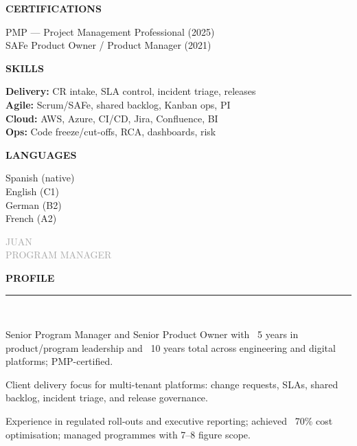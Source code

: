 \documentclass[12pt,a4paper]{article}
\newcommand{\headleft}[1]{%
  \vspace*{2ex}\textsc{\textbf{\color{softwhite}#1}}\par%
  \vspace*{-1.2ex}{\color{softwhite}\hrulefill}\par\vspace*{0.8ex}
}
\newcommand{\headright}[1]{%
  \vspace{0.6ex}%
  {\sffont\bfseries\large\addfontfeatures{LetterSpace=2.0}\textcolor{cvblue}{\MakeUppercase{#1}}}\\[-1ex]%
  {\color{cvblue}\rule{\dimexpr\linewidth\relax}{0.6pt}}\\[-0.6ex]%
}
\newlength{\SideBarW}
\begin{document}
\begin{minipage}[t]{\textwidth}
{{\begin{minipage}[t]{\dimexpr\linewidth-8mm\relax}
      \vspace*{2.5mm}
      \headleft{CERTIFICATIONS}
      PMP — Project Management Professional (2025)\\[0.4ex]
      SAFe Product Owner / Product Manager (2021)

      \vspace*{2.5mm}
      \headleft{SKILLS}
      \textbf{Delivery:} CR intake, SLA control, incident triage, releases\\[0.3ex]
      \textbf{Agile:} Scrum/SAFe, shared backlog, Kanban ops, PI\\[0.3ex]
      \textbf{Cloud:} AWS, Azure, CI/CD, Jira, Confluence, BI\\[0.3ex]
      \textbf{Ops:} Code freeze/cut-offs, RCA, dashboards, risk

      \vspace*{2.5mm}
      \headleft{LANGUAGES}
      Spanish (native)\\
      English (C1)\\
      German (B2)\\
      French (A2)

    \end{minipage}
  }%
}%
\hspace{4mm}%
\begin{minipage}[t]{\dimexpr\textwidth-\SideBarW-4mm\relax}
  \raggedright
  \setlength{\parskip}{0.45ex}

\vspace*{14mm}
\begin{center}
  {\sffont\fontsize{38}{40}\textcolor{darkgray}{JUAN}}%
  \\[1.8ex]
  {\sffont\fontsize{15}{17}\textcolor{darkgray}{PROGRAM MANAGER}}
\end{center}

\vspace{2mm}
\headright{Profile}
\begin{cvitemize}
  \item Senior Program Manager and Senior Product Owner with ~5 years in product/program leadership and ~10 years total across engineering and digital platforms; PMP-certified.
  \item Client delivery focus for multi-tenant platforms: change requests, SLAs, shared backlog, incident triage, and release governance.
  \item Experience in regulated roll-outs and executive reporting; achieved ~70\% cost optimisation; managed programmes with 7–8 figure scope.
\end{cvitemize}


\end{minipage}
\end{minipage}
\end{document}
